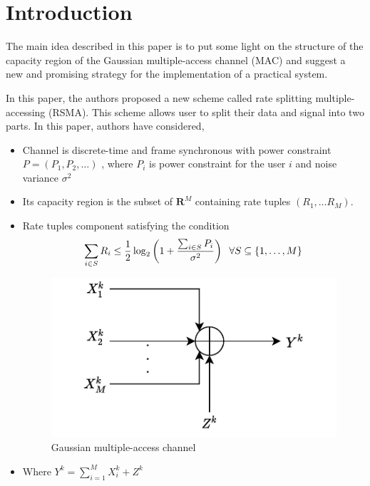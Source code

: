 \documentclass{article}
\begin{document}
	\section{Introduction}
The main idea described in this paper is to put some light on the structure of the capacity region of the Gaussian multiple-access channel (MAC) and suggest a new and promising strategy for the implementation of a practical system.\par In this paper\cite{2}, the authors proposed a new scheme called rate splitting multiple-accessing (RSMA). This scheme allows user to split their data and signal into two parts. In this paper, authors  have considered,
\begin{itemize}
	\item Channel is discrete-time and frame synchronous with power constraint $P = (P_1, P_2, \dots )$ , where $P_i$ is power constraint for the user $i$ and noise variance $\sigma^2$
	\item Its capacity region is the subset of $\mathbf{R}^M$ containing rate tuples $(R_1,\dots R_M)$.
	\item Rate tuples component satisfying the condition
		\begin{equation}
			\sum_{i \in S}  R_i\leq \frac{1}{2}\log_2\left(1 + \frac{\sum_{i \in S} P_{i} }{\sigma^2} \right) \hspace{2mm} \forall S \subseteq \{ 1, \dots ,M\}
			\end{equation}
	 \begin{center}
		\begin{figure}[htb!]
			\centering
			\includegraphics[height=.20\textheight]{pic1.pdf}
			\caption{Gaussian multiple-access channel}
			\label{fig1}
		\end{figure}
	\end{center}
\item Where $Y^{k} = \sum_{i =1}^{M} X_{i}^{k} + Z^{k}$
	\end{itemize}
\end{document}
